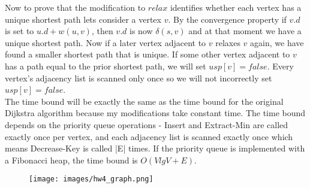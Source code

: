 \documentclass{article}
\begin{document}
Now to prove that the modification to $relax$ identifies whether each vertex has a unique shortest path lets consider a vertex $v$. By the convergence property if $v.d$ is set to $u.d + w(u,v)$, then $v.d$ is now $\delta(s,v)$ and at that moment we have a unique shortest path. Now if a later vertex adjacent to $v$ relaxes $v$ again, we have found a smaller shortest path that is unique.  If some other vertex adjacent to $v$ has a path equal to the prior shortest path, we will set $usp[v]=false$.  Every vertex's adjacency list is scanned only once so we will not incorrectly set $usp[v]=false$.\\
The time bound will be exactly the same as the time bound for the original Dijkstra algorithm because my modifications take constant time. The time bound depends on the priority queue operations - Insert and Extract-Min are called exactly once per vertex, and each adjacency list is scanned exactly once which means Decrease-Key is called |E| times. If the priority queue is implemented with a Fibonacci heap, the time bound is $O(VlgV + E)$.
\begin{figure}
\centering
\texttt{[image: images/hw4\_graph.png]}
\caption{}
\end{figure}
\end{document}
